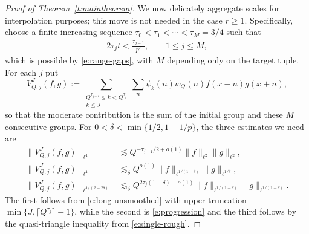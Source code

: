\documentclass[12pt,leqno]{amsart}
\numberwithin{equation}{section}
\theoremstyle{definition}
\theoremstyle{plain}
\begin{document}
\begin{proof}[Proof of Theorem~\ref{t:maintheorem}]
		We now delicately aggregate scales for interpolation purposes; this move is not needed in the case $r \geq 1$. Specifically, choose a finite increasing sequence
		$\tau_0<\tau_1<\cdots<\tau_M=3/4$ such that
		\begin{align}\label{e:group-cutoffs}
			2\tau_jt<\frac{\tau_{j-1}}{p'},
			\qquad 1\leq j\leq M,
		\end{align}
		which is possible by \eqref{e:range-gaps}, with $M$ depending only
		on the target tuple.
		For each $j$ put
		\[
		V_{Q,j}^J(f,g):=
		\sum_{\substack{Q^{\tau_{j-1}}\leq k<Q^{\tau_j}\\k\leq J}}
		\sum_n\psi_k(n)w_Q(n)f(x-n)g(x+n),
		\]
		so that the moderate contribution is the sum of the initial group
		and these $M$ consecutive groups.
		For $0<\delta<\min\{1/2,1-1/p\}$, the three estimates we need are
		\begin{align}
			\|V_{Q,j}^J(f,g)\|_{\ell^1}
			&\lesssim Q^{-\tau_{j-1}/2+o(1)}
			\|f\|_{\ell^2}\|g\|_{\ell^2},\label{e:secondinterp}\\
			\|V_{Q,j}^J(f,g)\|_{\ell^1}
			&\lesssim_\delta Q^{o(1)}
			\|f\|_{\ell^{1/(1-\delta)}}\|g\|_{\ell^{1/\delta}},
			\label{e:thirdinterp}\\
			\|V_{Q,j}^J(f,g)\|_{\ell^{1/(2-2\delta)}}
			&\lesssim_\delta Q^{2\tau_j(1-\delta)+o(1)}
			\|f\|_{\ell^{1/(1-\delta)}}
			\|g\|_{\ell^{1/(1-\delta)}}.\label{e:fourthinterp}
		\end{align}
		The first follows from \eqref{e:long-unsmoothed} with upper truncation
		$\min\{J,\lceil Q^{\tau_j}\rceil-1\}$, while the second is
		\eqref{e:progression} and the third follows by the quasi-triangle
		inequality from \eqref{e:single-rough}.
		

\end{proof}
\end{document}
